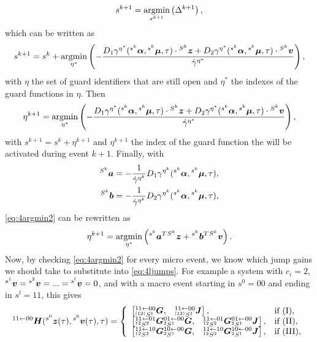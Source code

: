 \documentclass[../DC2017114Bouma.tex]{subfiles}
\begin{document}
\begin{align}
s^{k+1} = \underset{s^{k+1}}{\operatorname{\text{argmin}}}\left(\Delta^{k+1}\right),
\end{align}
which can be written as
\begin{align}
s^{k+1} = s^k + \underset{\eta^*}{\operatorname{\text{argmin}}}\left(-\frac{D_1\gamma^{\eta^*}(\hspace{0cm}^{s^k}\boldsymbol{\alpha},\hspace{0cm}^{s^k}\boldsymbol{\mu},\tau)\cdot\hspace{0cm}^{S^k}{\boldsymbol{z}} + D_2\gamma^{\eta^*}(\hspace{0cm}^{s^k}\boldsymbol{\alpha},\hspace{0cm}^{s^k}\boldsymbol{\mu},\tau)\cdot\hspace{0cm}^{S^k}{\boldsymbol{v}}}{\dot{\gamma}^{\eta^*}}\right),
\end{align}
with $\eta$ the set of guard identifiers that are still open and $\eta^*$ the indexes of the guard functions in $\eta$. Then
\begin{align}
\eta^{k+1} = \underset{\eta^*}{\operatorname{\text{argmin}}}\left(-\frac{D_1\gamma^{\eta^*}(\hspace{0cm}^{s^k}\boldsymbol{\alpha},\hspace{0cm}^{s^k}\boldsymbol{\mu},\tau)\cdot\hspace{0cm}^{S^k}{\boldsymbol{z}} + D_2\gamma^{\eta^*}(\hspace{0cm}^{s^k}\boldsymbol{\alpha},\hspace{0cm}^{s^k}\boldsymbol{\mu},\tau)\cdot\hspace{0cm}^{S^k}{\boldsymbol{v}}}{\dot{\gamma}^{\eta^*}}\right),\label{eq:4argmin2}
\end{align}
with $s^{k+1} = s^k + \eta^{k+1}$ and $\eta^{k+1}$ the index of the guard function the will be activated during event $k+1$. Finally, with
\begin{align}
\hspace{0cm}^{S^k}{\boldsymbol{a}} &= -\frac{1}{\dot{\gamma}^{\eta^k}}D_1\gamma^{\eta^k}(\hspace{0cm}^{s^k}\boldsymbol{\alpha},\hspace{0cm}^{s^k}\boldsymbol{\mu},\tau),\\
\hspace{0cm}^{S^k}{\boldsymbol{b}} &= -\frac{1}{\dot{\gamma}^{\eta^k}}D_2\gamma^{\eta^k}(\hspace{0cm}^{s^k}\boldsymbol{\alpha},\hspace{0cm}^{s^k}\boldsymbol{\mu},\tau),
\end{align}
\eqref{eq:4argmin2} can be rewritten as
\begin{align}
\eta^{k+1} = \underset{\eta^*}{\operatorname{\text{argmin}}}\left(\hspace{0cm}^{s^k}{\boldsymbol{a}}^T\hspace{0cm}^{S^k}{\boldsymbol{z}} +\hspace{0cm}^{s^k}{\boldsymbol{b}}^T\hspace{0cm}^{S^k}{\boldsymbol{v}}\right).
\end{align}
Now, by checking \eqref{eq:4argmin2} for every micro event, we know which jump gains we should take to substitute into \eqref{eq:4ljumps}.
For example a system with $c_i = 2$, $\hspace{0cm}^{s^1}{\boldsymbol{v}}=\hspace{0cm}^{s^2}{\boldsymbol{v}}=...=\hspace{0cm}^{s^l}{\boldsymbol{v}}=0$, and with a macro event starting in $s^0 = 00$ and ending in $s^l = 11$, this gives 
\begin{align}
\hspace{0cm}^{11\leftarrow 00}{\boldsymbol{H}}(\hspace{0cm}^{s^0}{\boldsymbol{z}}(\tau),\hspace{0cm}^{s^0}{\boldsymbol{v}}(\tau),\tau) = \left\lbrace\begin{array}{ll}
\begin{bmatrix}\hspace{0cm}^{11\leftarrow 00}_{\hspace{0cm}^{(12)}S^1}{\boldsymbol{G}}, & \hspace{0cm}^{11\leftarrow 00}_{\hspace{0cm}^{(12)}S^1}{\boldsymbol{J}}\end{bmatrix}, & \text{if }(\text{I}),\\
\begin{bmatrix}\hspace{0cm}^{11\leftarrow 01}_{\hspace{0cm}^{12}S^2}{\boldsymbol{G}} \hspace{0cm}^{01\leftarrow 00}_{\hspace{0cm}^{2}S^1}{\boldsymbol{G}}, & \hspace{0cm}^{11\leftarrow 01}_{\hspace{0cm}^{12}S^2}{\boldsymbol{G}} \hspace{0cm}^{01\leftarrow 00}_{\hspace{0cm}^{2}S^1}{\boldsymbol{J}}\end{bmatrix}, & \text{if }(\text{II}),\\
\begin{bmatrix}\hspace{0cm}^{11\leftarrow 10}_{\hspace{0cm}^{12}S^2}{\boldsymbol{G}} \hspace{0cm}^{10\leftarrow 00}_{\hspace{0cm}^{2}S^1}{\boldsymbol{G}}, & \hspace{0cm}^{11\leftarrow 10}_{\hspace{0cm}^{12}S^2}{\boldsymbol{G}} \hspace{0cm}^{10\leftarrow 00}_{\hspace{0cm}^{2}S^1}{\boldsymbol{J}}\end{bmatrix}, & \text{if }(\text{III}),
\end{array}\right.\label{eq:4H2200}
\end{align}
\end{document}
